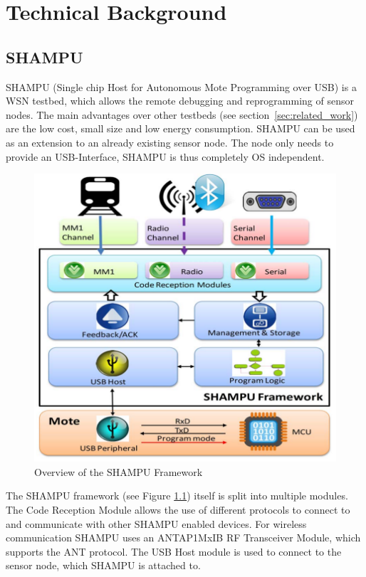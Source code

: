 \chapter{Technical Background}
\section{SHAMPU}
SHAMPU (Single chip Host for Autonomous Mote Programming over USB) \cite{Smeets:2014:DAL:2602339.2602401} is a WSN testbed, which allows the remote debugging and reprogramming of sensor nodes. The main advantages over other testbeds (see section~\ref{sec:related_work}) are the low cost, small size and low energy consumption. SHAMPU can be used as an extension to an already existing sensor node. The node only needs to provide an USB-Interface, SHAMPU is thus completely OS independent.
\begin{figure}[h]
\centering
\includegraphics[scale=.5]{./pics/SHAMPUframework.png}
\caption{Overview of the SHAMPU Framework}\label{fig:shampuframework}
\end{figure}
The SHAMPU framework (see Figure \ref{fig:shampuframework}) itself is split into multiple modules. The Code Reception Module allows the use of different protocols to connect to and communicate with other SHAMPU enabled devices. For wireless communication SHAMPU uses an ANTAP1MxIB RF Transceiver Module, which supports the ANT protocol. The USB Host module is used to connect to the sensor node, which SHAMPU is attached to.

